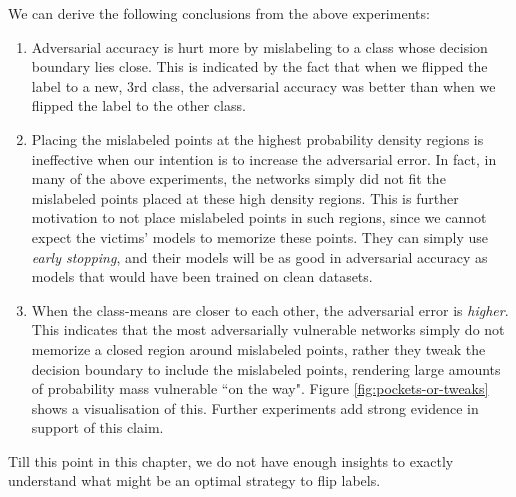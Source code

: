 \documentclass{ociamthesis}
\begin{document}
We can derive the following conclusions from the above experiments:
\begin{enumerate}
    \item Adversarial accuracy is hurt more by mislabeling to a class whose
    decision boundary lies close. This is indicated by the fact that when we
    flipped the label to a new, 3rd class, the adversarial accuracy was better
    than when we flipped the label to the other class.
    \item Placing the mislabeled points at the highest probability density
    regions is ineffective when our intention is to increase the adversarial
    error. In fact, in many of the above experiments, the networks simply did
    not fit the mislabeled points placed at these high density regions. This is
    further motivation to not place mislabeled points in such regions, since we
    cannot expect the victims' models to memorize these points. They can simply
    use \emph{early stopping}, and their models will be as good in adversarial
    accuracy as models that would have been trained on clean datasets.
    \item When the class-means are closer to each other, the adversarial error
    is \emph{higher}. This indicates that the most adversarially vulnerable
    networks simply do not memorize a closed region around mislabeled points,
    rather they tweak the decision boundary to include the mislabeled points,
    rendering large amounts of probability mass vulnerable ``on the way". Figure
    \ref{fig:pockets-or-tweaks} shows a visualisation of this. Further
    experiments add strong evidence in support of this claim.
\end{enumerate}

Till this point in this chapter, we do not have enough insights to exactly
understand what might be an optimal strategy to flip labels.




\end{document}
